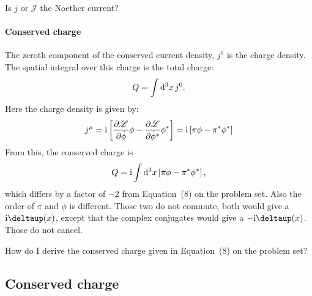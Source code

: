 \documentclass[11pt, english, fleqn, DIV=15, headinclude, BCOR=1cm]{scrartcl}
\begin{document}
\begin{question}
    Is $j$ or $\mathcal J$ the Noether current?
\end{question}

\paragraph{Conserved charge}

The zeroth component of the conserved current density, $j^0$ is the charge
density. The spatial integral over this charge is the total charge:
\begin{equation}
    Q = \int \mathop{}\!\mathrm d^3 x \, j^0.
\end{equation}
Here the charge density is given by:
\begin{equation}
    j^\mu
    = \mathrm i
    \left[ 
        \frac{\partial {\mathscr L}}{\partial {\dot\phi}} \phi
        - \frac{\partial {\mathscr L}}{\partial {\dot\phi^*}} \phi^*
     \right]
    = \mathrm i \left[  \pi \phi - \pi^* \phi^*  \right]
\end{equation}
From this, the conserved charge is
\begin{equation}
    \label{eq:mein-Q}
    Q = \mathrm i \int \mathop{}\!\mathrm d^3 x \left[  \pi \phi - \pi^* \phi^*  \right],
\end{equation}
which differs by a factor of $-2$ from Equation~(8) on the problem set. Also
the order of $\pi$ and $\phi$ is different. Those two do not commute, both
would give a $\iup\deltaup(x)$, except that the complex conjugates would give
a $-\iup\deltaup(x)$. Those do not cancel.

\needspace{5cm}
\begin{question}
    How do I derive the conserved charge given in Equation~(8) on the problem
    set?
\end{question}

\subsection{Conserved charge}
\end{document}
